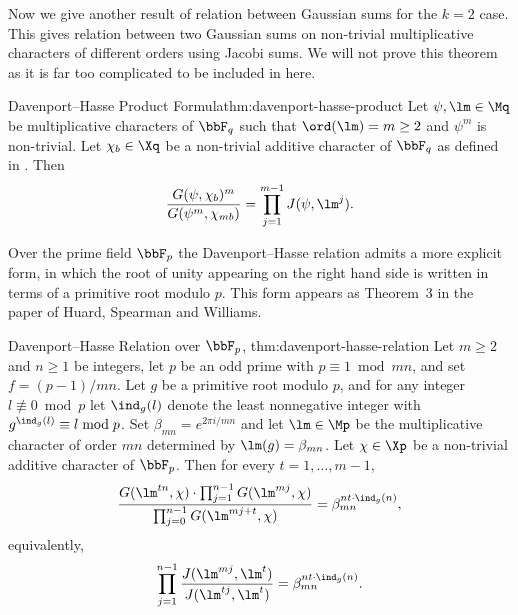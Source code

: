 Now we give another result of relation between Gaussian sums for the $k=2$ case. This gives relation between two Gaussian sums on non-trivial multiplicative characters of different orders using Jacobi sums. We will not prove this theorem as it is far too complicated to be included in here. 
\begin{Theorem}{Davenport--Hasse Product Formula}{thm:davenport-hasse-product}
  Let $\psi,\lm\in\Mq$ be multiplicative characters of $\bbF_q$ such that $\ord(\lm)=m\geq 2$ and $\psi^m$ is non-trivial. Let $\chi_b\in\Xq$ be a non-trivial additive character of $\bbF_q$ as defined in . Then $$\frac{G(\psi,\chi_b)^m}{G(\psi^m,\chi_{mb})} =\prod_{j=1}^{m-1}J(\psi,\lm^j).$$
\end{Theorem}

Over the prime field $\bbF_p$ the Davenport--Hasse relation admits a more explicit form, in which the root of unity appearing on the right hand side is written in terms of a primitive root modulo $p$. This form appears as Theorem~3 in the paper of Huard, Spearman and Williams.
\begin{Theorem}{Davenport--Hasse Relation over $\bbF_p$, \cite[Theorem~3]{HuardSpearmanWilliams_1995_AAA}}{thm:davenport-hasse-relation}
  Let $m\geq 2$ and $n\geq 1$ be integers, let $p$ be an odd prime with $p\equiv 1\bmod{mn}$, and set $f=(p-1)/mn$. Let $g$ be a primitive root modulo $p$, and for any integer $l\not\equiv 0\bmod p$ let $\ind_g(l)$ denote the least nonnegative integer with $g^{\ind_g(l)}\equiv l\bmod p$. Set $\beta_{mn}=e^{2\pi i/mn}$ and let $\lm\in\Mp$ be the multiplicative character of order $mn$ determined by $\lm(g)=\beta_{mn}$. Let $\chi\in\Xp$ be a non-trivial additive character of $\bbF_p$. Then for every $t=1,\dots,m-1$,
  $$\frac{G(\lm^{tn},\chi)\cdot \prod_{j=1}^{n-1}G(\lm^{mj},\chi)}{\prod_{j=0}^{n-1}G(\lm^{mj+t},\chi)}=\beta_{mn}^{nt\cdot \ind_g(n)},$$
  equivalently,
  $$\prod_{j=1}^{n-1}\frac{J(\lm^{mj},\lm^t)}{J(\lm^{tj},\lm^t)}=\beta_{mn}^{nt\cdot \ind_g(n)}.$$
\end{Theorem}

